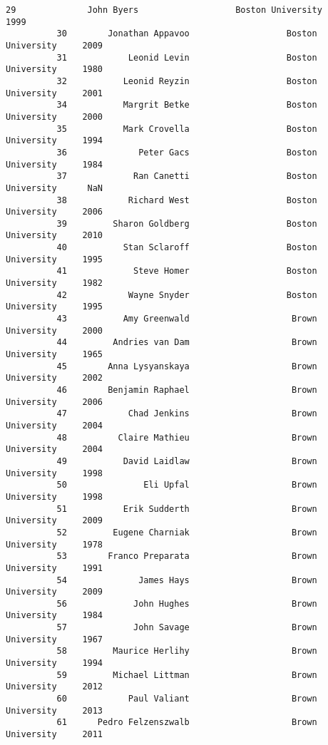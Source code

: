 \documentclass[11pt]{article}
\begin{document}
\begin{Verbatim}[commandchars=\\\{\}]
          29              John Byers                   Boston University     1999   
          30        Jonathan Appavoo                   Boston University     2009   
          31            Leonid Levin                   Boston University     1980   
          32           Leonid Reyzin                   Boston University     2001   
          34           Margrit Betke                   Boston University     2000   
          35           Mark Crovella                   Boston University     1994   
          36              Peter Gacs                   Boston University     1984   
          37             Ran Canetti                   Boston University      NaN   
          38            Richard West                   Boston University     2006   
          39         Sharon Goldberg                   Boston University     2010   
          40           Stan Sclaroff                   Boston University     1995   
          41             Steve Homer                   Boston University     1982   
          42            Wayne Snyder                   Boston University     1995   
          43           Amy Greenwald                    Brown University     2000   
          44         Andries van Dam                    Brown University     1965   
          45        Anna Lysyanskaya                    Brown University     2002   
          46        Benjamin Raphael                    Brown University     2006   
          47            Chad Jenkins                    Brown University     2004   
          48          Claire Mathieu                    Brown University     2004   
          49           David Laidlaw                    Brown University     1998   
          50               Eli Upfal                    Brown University     1998   
          51           Erik Sudderth                    Brown University     2009   
          52         Eugene Charniak                    Brown University     1978   
          53        Franco Preparata                    Brown University     1991   
          54              James Hays                    Brown University     2009   
          56             John Hughes                    Brown University     1984   
          57             John Savage                    Brown University     1967   
          58         Maurice Herlihy                    Brown University     1994   
          59         Michael Littman                    Brown University     2012   
          60            Paul Valiant                    Brown University     2013   
          61      Pedro Felzenszwalb                    Brown University     2011   

\end{Verbatim}
\end{document}
